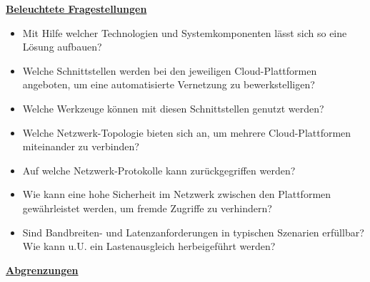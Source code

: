 \textbf{\underline{Beleuchtete Fragestellungen}}
\begin{itemize}
    \item Mit Hilfe welcher Technologien und Systemkomponenten lässt sich so eine Lösung aufbauen?
    \item Welche Schnittstellen werden bei den jeweiligen Cloud-Plattformen angeboten, um eine automatisierte Vernetzung zu bewerkstelligen?
    \item Welche Werkzeuge können mit diesen Schnittstellen genutzt werden?
    \item Welche Netzwerk-Topologie bieten sich an, um mehrere Cloud-Plattformen miteinander zu verbinden?
    \item Auf welche Netzwerk-Protokolle kann zurückgegriffen werden?
    \item Wie kann eine hohe Sicherheit im Netzwerk zwischen den Plattformen gewährleistet werden, um fremde Zugriffe zu verhindern?
    \item Sind Bandbreiten- und Latenzanforderungen in typischen Szenarien erfüllbar? Wie kann u.U. ein Lastenausgleich herbeigeführt werden?
\end{itemize}

\textbf{\underline{Abgrenzungen}}\label{abgrenzung}


